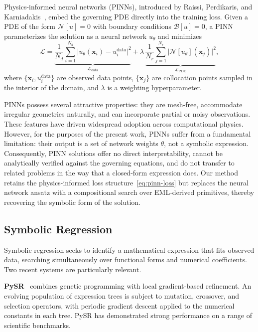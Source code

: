 Physics-informed neural networks (PINNs), introduced by Raissi, Perdikaris,
and Karniadakis~\cite{raissi2019}, embed the governing PDE directly into the
training loss.  Given a PDE of the form $\mathcal{N}[u] = 0$ with boundary
conditions $\mathcal{B}[u] = 0$, a PINN parameterizes the solution as a neural
network $u_{\theta}$ and minimizes
\begin{equation}
  \mathcal{L}
  = \underbrace{\frac{1}{N_d}\sum_{i=1}^{N_d}
      \big|u_{\theta}(\mathbf{x}_i) - u_i^{\mathrm{data}}\big|^{2}
    }_{\mathcal{L}_{\mathrm{data}}}
  + \lambda\,
    \underbrace{\frac{1}{N_r}\sum_{j=1}^{N_r}
      \big|\mathcal{N}[u_{\theta}](\mathbf{x}_j)\big|^{2}
    }_{\mathcal{L}_{\mathrm{PDE}}},
  \label{eq:pinn-loss}
\end{equation}
where $\{\mathbf{x}_i, u_i^{\mathrm{data}}\}$ are observed data points,
$\{\mathbf{x}_j\}$ are collocation points sampled in the interior of the
domain, and $\lambda$ is a weighting hyperparameter.

PINNs possess several attractive properties: they are mesh-free, accommodate
irregular geometries naturally, and can incorporate partial or noisy
observations.  These features have driven widespread adoption across
computational physics.  However, for the purposes of the present work, PINNs
suffer from a fundamental limitation: their output is a set of network weights
$\theta$, not a symbolic expression.  Consequently, PINN solutions offer no
direct interpretability, cannot be analytically verified against the governing
equations, and do not transfer to related problems in the way that a closed-form
expression does.  Our method retains the physics-informed loss
structure~\eqref{eq:pinn-loss} but replaces the neural network ansatz with a
compositional search over EML-derived primitives, thereby recovering the
symbolic form of the solution.

\subsection{Symbolic Regression}
\label{sec:symreg}

Symbolic regression seeks to identify a mathematical expression that fits
observed data, searching simultaneously over functional forms and numerical
coefficients.  Two recent systems are particularly relevant.

\textbf{PySR}~\cite{cranmer2023} combines genetic programming with local
gradient-based refinement.  An evolving population of expression trees is
subject to mutation, crossover, and selection operators, with periodic
gradient descent applied to the numerical constants in each tree.  PySR has
demonstrated strong performance on a range of scientific benchmarks.

